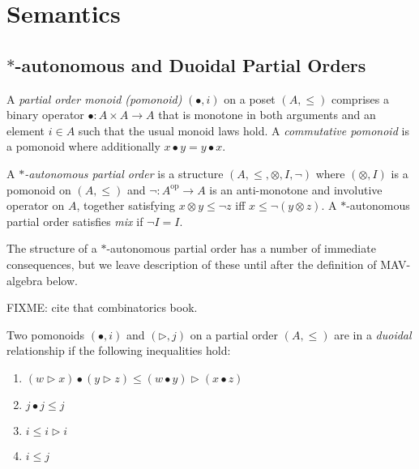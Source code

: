 \section{Semantics}\label{sec:mav-semantics}

\newcommand{\LowerSet}[1]{\widehat{#1}}
\newcommand{\Day}[1]{\mathop{\widehat{#1}}}
\newcommand{\ClosedLowerSet}[1]{\widehat{#1}^+}
\newcommand{\ClosedDay}[1]{\mathop{\widehat{#1}^+}}
\newcommand{\Chu}{\mathrm{Chu}}
\newcommand{\op}{\mathrm{op}}

\subsection{$*$-autonomous and Duoidal Partial Orders}

\begin{definition}
  A \emph{partial order monoid (pomonoid)} $(\bullet, i)$ on a poset
  $(A, \leq)$ comprises a binary operator $\bullet : A \times A \to A$
  that is monotone in both arguments and an element $i \in A$ such
  that the usual monoid laws hold. A \emph{commutative pomonoid} is a
  pomonoid where additionally $x \bullet y = y \bullet x$.
\end{definition}

\begin{definition}
  A \emph{$*$-autonomous partial order} is a structure
  $(A, \leq, \otimes, I, \lnot)$ where $(\otimes, I)$ is a pomonoid on
  $(A, \leq)$ and $\lnot : A^\op \to A$ is an anti-monotone and
  involutive operator on $A$, together satisfying
  $x \otimes y \leq \lnot z$ iff $x \leq \lnot (y \otimes z)$.  A
  $*$-autonomous partial order satisfies \emph{mix} if $\lnot I = I$.
\end{definition}

\begin{remark}
  The structure of a $*$-autonomous partial order has a number of
  immediate consequences, but we leave description of these until
  after the definition of MAV-algebra below. 
\end{remark}

FIXME: cite that combinatorics book.


\begin{definition}
  Two pomonoids $(\bullet, i)$ and $(\rhd, j)$ on a partial order
  $(A, \leq)$ are in a \emph{duoidal} relationship if the following
  inequalities hold:
  \begin{enumerate}
  \item $(w \rhd x) \bullet (y \rhd z) \leq (w \bullet y) \rhd (x \bullet z)$
  \item $j \bullet j \leq j$
  \item $i \leq i \rhd i$
  \item $i \leq j$
  \end{enumerate}
\end{definition}

